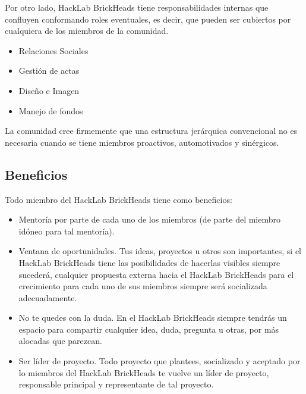 \documentclass[12pt, letterpaper]{article}
\begin{document}
    Por otro lado, HackLab BrickHeads tiene responsabilidades internas que 
    confluyen conformando roles eventuales, es decir, que pueden ser cubiertos 
    por cualquiera de los miembros de la comunidad.
    \begin{itemize}
        \item Relaciones Sociales
        \item Gestión de actas
        \item Diseño e Imagen
        \item Manejo de fondos
    \end{itemize}

    La comunidad cree firmemente que una estructura jerárquica convencional no
    es necesaria cuando se tiene miembros proactivos, automotivados y
    sinérgicos.

    \subsection{Beneficios}
    Todo miembro del HackLab BrickHeads tiene como beneficios:
    \begin{itemize}
        \item Mentoría por parte de cada uno de los miembros (de parte del 
        miembro idóneo para tal mentoría).
        \item Ventana de oportunidades. Tus ideas, proyectos u otros son 
        importantes, si el HackLab BrickHeads tiene las posibilidades 
        de hacerlas visibles siempre sucederá, cualquier propuesta externa 
        hacia el HackLab BrickHeads para el crecimiento para cada uno de sus
        miembros siempre será socializada adecuadamente.
        \item No te quedes con la duda. En el HackLab BrickHeads siempre tendrás
        un espacio para compartir cualquier idea, duda, pregunta u otras, por 
        más alocadas que parezcan.
        \item Ser líder de proyecto. Todo proyecto que plantees, socializado y 
        aceptado por lo miembros del HackLab BrickHeads te vuelve un líder 
        de proyecto, responsable principal y representante de tal proyecto.
    \end{itemize}
\end{document}

